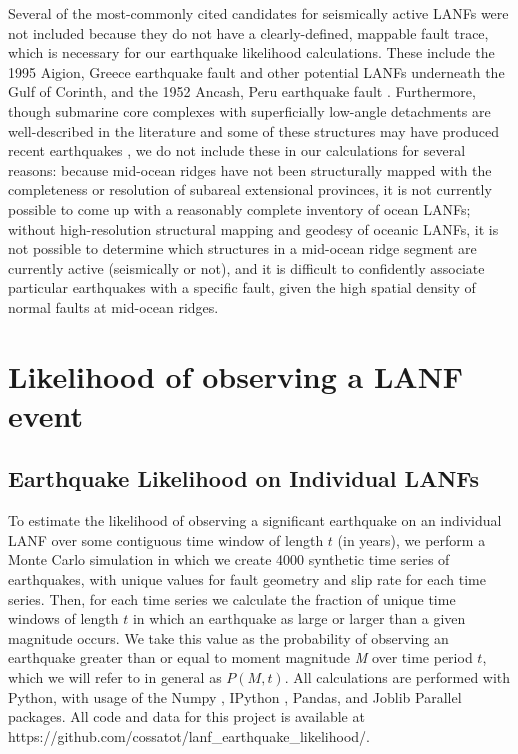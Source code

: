 \documentclass[twocolumn,grl]{AGUTeX}
\begin{document}
\begin{article}
Several of the most-commonly cited candidates for seismically active LANFs were
not included because they do not have a clearly-defined, mappable fault trace,
which is necessary for our earthquake likelihood calculations.  These include
the 1995 Aigion, Greece earthquake fault \citep{bernard1997} and other
potential LANFs underneath the Gulf of Corinth, and the 1952 Ancash, Peru
earthquake fault \citep{doser1987ancash}. Furthermore, though submarine core
complexes with superficially low-angle detachments are well-described in the
literature and some of these structures may have produced recent earthquakes
\citep{abers2001}, we do not include these in our calculations for several
reasons: because mid-ocean ridges have not been structurally mapped with the
completeness or resolution of subareal extensional provinces, it is not
currently possible to come up with a reasonably complete inventory of ocean
LANFs; without high-resolution structural mapping and geodesy of oceanic LANFs,
it is not possible to determine which structures in a mid-ocean ridge segment
are currently active (seismically or not), and it is difficult to confidently
associate particular earthquakes with a specific fault, given the high spatial
density of normal faults at mid-ocean ridges.


\section{Likelihood of observing a LANF event}
\subsection{Earthquake Likelihood on Individual LANFs}
To estimate the likelihood of observing a significant earthquake on an
individual LANF over some contiguous time window of length $t$ (in years), we
perform a Monte Carlo simulation in which we create 4000 synthetic time series
of earthquakes, with unique values for fault geometry and slip rate for each
time series. Then, for each time series we calculate the fraction of unique
time windows of length $t$ in which an earthquake as large or larger than
a given magnitude occurs.  We take this value as the probability of observing
an earthquake greater than or equal to moment magnitude \emph{M} over time
period $t$, which we will refer to in general as $P(M,t)$.  All calculations
are performed with Python, with usage of the Numpy \citep{oliphant2007numpy},
IPython \citep{perez2007ipython}, Pandas, and Joblib Parallel
\citep{varoquaux_joblib} packages.  All code and data for this project is
available at https://github.com/cossatot/lanf\_earthquake\_likelihood/.


\end{article}
\end{document}
